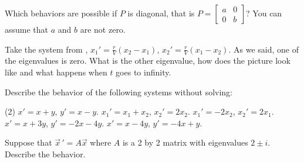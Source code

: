 \begin{exercise}
Which behaviors are possible if $P$ is diagonal, that is
$P = \left[ \begin{smallmatrix} a & 0 \\ 0 & b \end{smallmatrix} \right]$?
You can assume that $a$ and $b$ are not zero.
\end{exercise}

\begin{exercise}
Take the system from ,
$x_1'=\frac{r}{V}(x_2-x_1)$,
$x_2'=\frac{r}{V}(x_1-x_2)$.
As we said, one of the eigenvalues is zero.  What is the other eigenvalue, how
does the picture look like and what happens when $t$ goes to infinity.
\end{exercise}

\setcounter{exercise}{100}

\begin{exercise}
Describe the behavior of the following systems without solving:
\begin{tasks}(2)
\task $x' = x + y$, \quad $y' = x-y$.
\task $x_1' = x_1 + x_2$, \quad $x_2' = 2 x_2$.
\task $x_1' = -2x_2$, \quad $x_2' = 2 x_1$.
\task $x' = x + 3y$, \quad $y' = -2x-4y$.
\task $x' = x - 4y$, \quad $y' = -4x+y$.
\end{tasks}
\end{exercise}

\begin{exercise}
Suppose that $\vec{x}\,' = A \vec{x}$ where $A$ is a 2 by 2 matrix
with eigenvalues $2\pm i$.  Describe the behavior.
\end{exercise}


